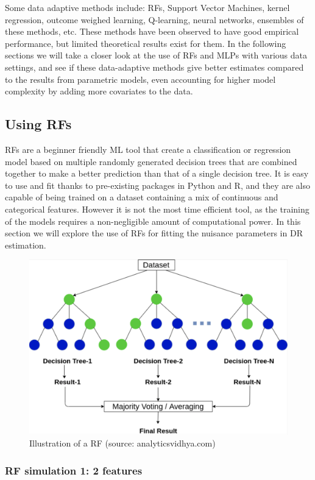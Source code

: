 \documentclass[12pt,twoside]{article}
\begin{document}
Some data adaptive methods include: RFs, Support Vector Machines, kernel regression, outcome weighed learning, Q-learning, neural networks, ensembles of these methods, etc. These methods have been observed to have good empirical performance, but limited theoretical results exist for them. In the following sections we will take a closer look at the use of RFs and MLPs with various data settings, and see if these data-adaptive methods give better estimates compared to the results from parametric models, even accounting for higher model complexity by adding more covariates to the data.

\subsection{Using RFs}

RFs are a beginner friendly ML tool that create a classification or regression model based on multiple randomly generated decision trees that are combined together to make a better prediction than that of a single decision tree. It is easy to use and fit thanks to pre-existing packages in Python and R, and they are also capable of being trained on a dataset containing a mix of continuous and categorical features. However it is not the most time efficient tool, as the training of the models requires a non-negligible amount of computational power. In this section we will explore the use of RFs for fitting the nuisance parameters in DR estimation.

\begin{figure}
    \centering
    \includegraphics[width = 0.7\columnwidth]{figures/tree.png}
    \caption{Illustration of a RF (source: analyticsvidhya.com)}
    \label{fig:my_label}
\end{figure}


\subsubsection{RF simulation 1: 2 features}
\end{document}
